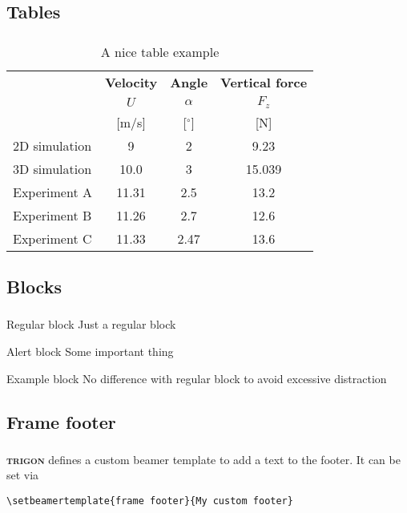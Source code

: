 \documentclass[aspectratio=169]{beamer}
\newcommand{\themename}{\textbf{\textsc{trigon}}\xspace}
\begin{document}
\subsection{Tables}
\begin{frame}
  \frametitle{\insertsectionhead}
  \framesubtitle{\insertsubsectionhead}
  \begin{table}[H]
    \centering
    \caption{A nice table example}
    \begin{tabular}{@{} lccc @{}}
      \toprule
      & \textbf{Velocity} & \textbf{Angle}  & \textbf{Vertical force} \\
      & $U$ & $\alpha$  & $F_z$ \\
      & [m/s] & [$^\circ$]  & [N] \\
      \midrule
      2D simulation  & 9 & 2 & 9.23 \\
      3D simulation  & 10.0 & 3 & 15.039 \\
      Experiment A   & 11.31 & 2.5 & 13.2 \\
      Experiment B   & 11.26 & 2.7 & 12.6 \\
      Experiment C   & 11.33 & 2.47 & 13.6 \\
      \bottomrule
    \end{tabular}
  \end{table}

\end{frame}

\subsection{Blocks}
\begin{frame}
  \frametitle{\insertsectionhead}
  \framesubtitle{\insertsubsectionhead}
  \begin{block}{Regular block}
    Just a regular block
  \end{block}
  \begin{alertblock}{Alert block}
    Some important thing
  \end{alertblock}
  \begin{exampleblock}{Example block}
    No difference with regular block to avoid excessive distraction
  \end{exampleblock}
\end{frame}

\subsection{Frame footer}
{
\begin{frame}[fragile]
  \frametitle{\insertsectionhead}
  \framesubtitle{\insertsubsectionhead}
    \themename defines a custom beamer template to add a text to the footer. It can be set via
    \begin{verbatim}\setbeamertemplate{frame footer}{My custom footer}\end{verbatim}
\end{frame}
}
\end{document}
